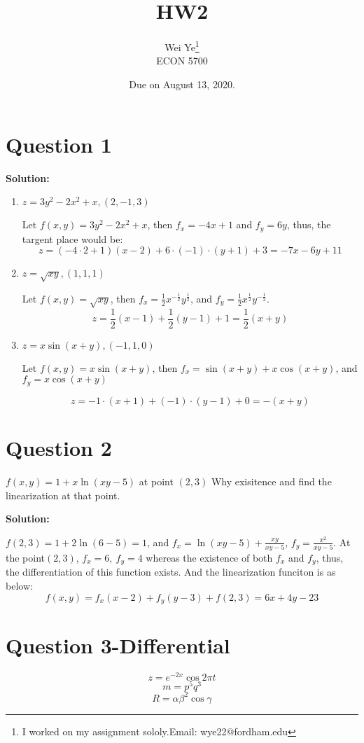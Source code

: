 \documentclass[11pt]{article} %
\title{HW2}
\author{Wei Ye\footnote{I worked on my assignment sololy.Email: wye22@fordham.edu}  	\\
	ECON 5700}
\date{Due on August 13, 2020.}
\begin{document}
	\maketitle
	\section{Question 1}
	\textbf{Solution:}
	
	\begin{enumerate}
		\item $z=3y^2-2x^2+x, (2,-1,3)$
		
		Let $f(x,y)=3y^2-2x^2+x$, then $f_x=-4x+1$ and $f_y=6y$, thus, the targent place would be:
		$$z=(-4\cdot 2+1)(x-2)+6\cdot(-1)\cdot(y+1)+3=-7x-6y+11$$
		
	
		\item $z=\sqrt{xy}, (1,1,1)$
		
		Let $f(x,y)=\sqrt{xy}$, then $f_x=\frac{1}{2}x^{-\frac{1}{2}}y^{\frac{1}{2}}$, and $f_y=\frac{1}{2}x^{\frac{1}{2}}y^{-\frac{1}{2}} $.
		$$z=\frac{1}{2}(x-1)+\frac{1}{2}(y-1)+1=\frac{1}{2}(x+y)$$
		
		
		
		
		\item $z=x\sin(x+y), (-1,1,0)$
		
		Let $f(x,y)=x\sin(x+y)$, then $f_x=\sin(x+y)+x\cos(x+y)$, and $f_y=x\cos(x+y)$
		
		$$z=-1\cdot(x+1)+(-1)\cdot(y-1)+0=-\left(x+y\right)$$ 
		
		
	\end{enumerate}
	\section{Question 2}
	$f(x,y)=1+x\ln(xy-5)$ at point $(2,3)$ Why exisitence and find the linearization at that point.
	
\textbf{Solution:}

$f(2,3)=1+2\ln(6-5)=1$, and $f_x=\ln(xy-5)+\frac{xy}{xy-5}$, $f_y=\frac{x^2}{xy-5}$. At the point$(2,3)$, $f_x=6,\ f_y=4$ whereas the existence of both $f_x$ and $f_y$, thus, the differentiation of this function exists. And the linearization funciton is as below:
$$f(x,y)=f_x(x-2)+f_y(y-3)+f(2,3)=6x+4y-23$$

	
\section{Question 3-Differential}
$$z=e^{-2x}\cos 2\pi t$$
$$m=p^5q^3$$
$$R=\alpha\beta^2\cos\gamma$$
\end{document}
